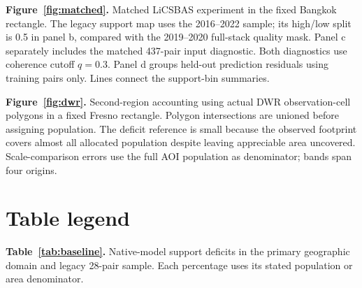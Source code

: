 \documentclass[pdflatex,sn-nature]{sn-jnl}
\begin{document}
\noindent\textbf{Figure~\ref{fig:matched}.} Matched LiCSBAS experiment in the fixed Bangkok rectangle. The legacy support map uses the 2016--2022 sample; its high/low split is 0.5 in panel b, compared with the 2019--2020 full-stack quality mask. Panel c separately includes the matched 437-pair input diagnostic. Both diagnostics use coherence cutoff $q=0.3$. Panel d groups held-out prediction residuals using training pairs only. Lines connect the support-bin summaries.

\noindent\textbf{Figure~\ref{fig:dwr}.} Second-region accounting using actual DWR observation-cell polygons in a fixed Fresno rectangle. Polygon intersections are unioned before assigning population. The deficit reference is small because the observed footprint covers almost all allocated population despite leaving appreciable area uncovered. Scale-comparison errors use the full AOI population as denominator; bands span four origins.

\section*{Table legend}
\noindent\textbf{Table~\ref{tab:baseline}.} Native-model support deficits in the primary geographic domain and legacy 28-pair sample. Each percentage uses its stated population or area denominator.
\end{document}
